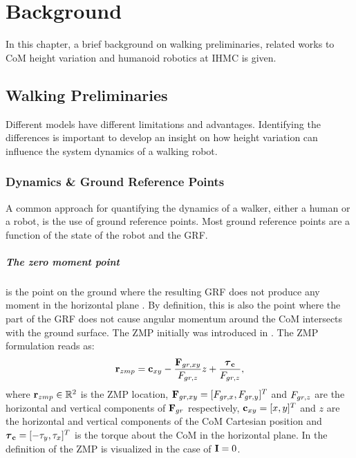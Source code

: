 %
\chapter{Background}\label{chap:background}
In this chapter, a brief background on walking preliminaries, related works to \ac{CoM} height variation and humanoid robotics at \ac{IHMC} is given.
\section{Walking Preliminaries}
Different models have different limitations and advantages. Identifying the differences is important to develop an insight on how height variation can influence the system dynamics of a walking robot.
\subsection{Dynamics \& Ground Reference Points}\label{sec:grp}
A common approach for quantifying the dynamics of a walker, either a human or a robot, is the use of ground reference points. Most ground reference points are a function of the state of the robot and the \ac{GRF}.

\paragraph{The zero moment point} is the point on the ground where the resulting \ac{GRF} does not produce any moment in the horizontal plane \cite{sardain2004forces}. By definition, this is also the point where the part of the \ac{GRF} does not cause angular momentum around the \ac{CoM} intersects with the ground surface. The \ac{ZMP} initially was introduced in \cite{vukobratovic1969contribution}. The \ac{ZMP} formulation reads as:
\begin{equation}
    \mathbf{r}_{zmp}=\mathbf{c}_{xy}-\frac{\mathbf{F}_{gr,xy}}{F_{gr,z}}z+\frac{\boldsymbol{\tau}_{\mathbf{c}}}{F_{gr,z}},
\end{equation}
where $\mathbf{r}_{zmp} \in \mathbb{R}^2$ is the \ac{ZMP} location, $\mathbf{F}_{gr,xy}=[F_{gr,x},F_{gr,y}]^T$ and $F_{gr,z}$ are the horizontal and vertical components of $\mathbf{F}_{gr}$ respectively, $\mathbf{c}_{xy} = [x,y]^T$ and $z$ are the horizontal and vertical components of the \ac{CoM} Cartesian position and $\boldsymbol{\tau}_{\mathbf{c}} = [-\tau_y,\tau_x]^T$ is the torque about the \ac{CoM} in the horizontal plane. In  the definition of the \ac{ZMP} is visualized in the case of $\mathbf{I}=0$. 

